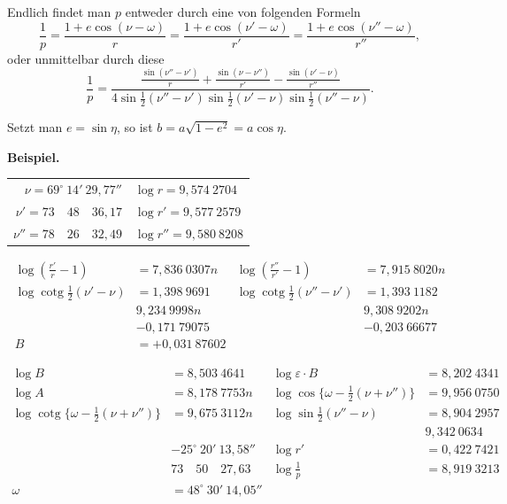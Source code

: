 \documentclass[12pt,a4paper]{article}
\DeclareMathOperator{\cotg}{cotg}
\theoremstyle{plain}
\theoremstyle{definition}
\theoremstyle{remark}
\begin{document}
Endlich findet man $p$ entweder durch eine von folgenden Formeln
\[
\frac{1}{p} = \frac{1 + e \cos(\nu - \omega)}{r} = \frac{1 + e \cos(\nu' - \omega)}{r'} = \frac{1 + e \cos(\nu'' - \omega)}{r''},
\]
oder unmittelbar durch diese
\[
\frac{1}{p} = \frac{\frac{\sin(\nu'' - \nu')}{r} + \frac{\sin(\nu - \nu'')}{r'} - \frac{\sin(\nu' - \nu)}{r''}}{4\sin\tfrac{1}{2}(\nu'' - \nu') \sin\tfrac{1}{2}(\nu' - \nu) \sin\tfrac{1}{2}(\nu'' - \nu)}.
\]

Setzt man $e = \sin\eta$, so ist $b = a \sqrt{1 - e^2} = a \cos\eta$.

\medskip

\noindent\textbf{Beispiel.}
\begin{center}
\begin{tabular}{r@{\quad}l}
$\nu = 69^\circ\ 14'\ 29{,}77''$ & $\log r = 9{,}574\ 2704$ \\
$\nu' = 73\quad 48\quad 36{,}17$ & $\log r' = 9{,}577\ 2579$ \\
$\nu'' = 78\quad 26\quad 32{,}49$ & $\log r'' = 9{,}580\ 8208$
\end{tabular}
\end{center}

\begin{align*}
\log(\tfrac{r'}{r} - 1) &= 7{,}836\ 0307n & \log(\tfrac{r''}{r'} - 1) &= 7{,}915\ 8020n \\
\log \cotg\tfrac{1}{2}(\nu' - \nu) &= 1{,}398\ 9691 & \log \cotg\tfrac{1}{2}(\nu'' - \nu') &= 1{,}393\ 1182 \\
& 9{,}234\ 9998n & & 9{,}308\ 9202n \\
& -0{,}171\ 79075 & & -0{,}203\ 66677 \\
B &= +0{,}031\ 87602
\end{align*}

\begin{align*}
\log B &= 8{,}503\ 4641 & \log \varepsilon \cdot B &= 8{,}202\ 4341 \\
\log A &= 8{,}178\ 7753n & \log \cos\{\omega - \tfrac{1}{2}(\nu + \nu'')\} &= 9{,}956\ 0750 \\
\log \cotg\{\omega - \tfrac{1}{2}(\nu + \nu'')\} &= 9{,}675\ 3112n & \log \sin\tfrac{1}{2}(\nu'' - \nu) &= 8{,}904\ 2957 \\
& & & 9{,}342\ 0634 \\
& -25^\circ\ 20'\ 13{,}58'' & \log r' &= 0{,}422\ 7421 \\
& 73\quad 50\quad 27{,}63 & \log \tfrac{1}{p} &= 8{,}919\ 3213 \\
\omega &= 48^\circ\ 30'\ 14{,}05''
\end{align*}
\end{document}
